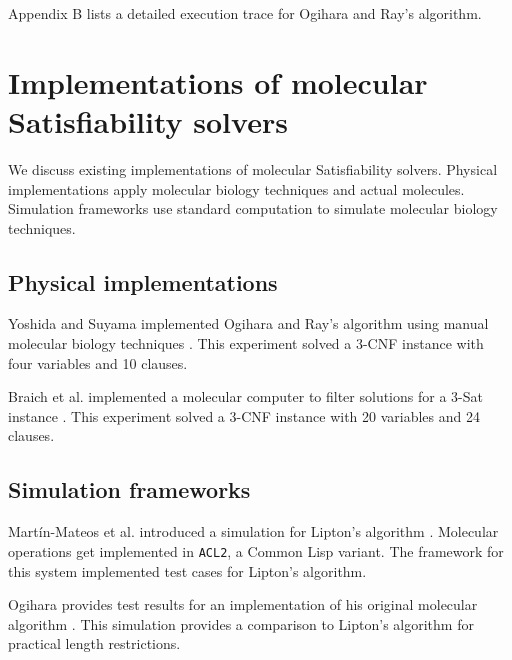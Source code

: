Appendix B lists a detailed execution trace for Ogihara and Ray's algorithm.

\section{Implementations of molecular {\sc Satisfiability} solvers}

We discuss existing implementations of molecular {\sc Satisfiability} solvers.  Physical implementations apply molecular biology techniques and actual molecules.  Simulation frameworks use standard computation to simulate molecular biology techniques.

	\subsection{Physical implementations}
	

Yoshida and Suyama implemented Ogihara and Ray's algorithm using manual molecular biology techniques \cite{dnaBasedImplemetation_Yoshida2000}.  This experiment solved a 3-CNF instance with four variables and 10 clauses.

Braich et al. implemented a molecular computer to filter solutions for a 3-{\sc Sat} instance \cite{Braich02solutionof}.  This experiment solved a 3-CNF instance with 20 variables and 24 clauses.
	
	\subsection{Simulation frameworks}

Mart\'{i}n-Mateos et al. introduced a simulation for Lipton's algorithm \cite{MartinMateos02molecularcomputation}.   Molecular operations get implemented in \texttt{ACL2}, a Common Lisp variant.  The framework for this system implemented test cases for Lipton's algorithm.

Ogihara provides test results for an implementation of his original molecular algorithm \cite{Ogihara:1996:BFS:898228}.  This simulation provides a comparison to Lipton's algorithm for practical length restrictions.
